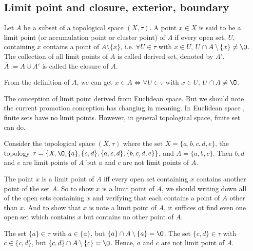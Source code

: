 \subsection{Limit point and closure, exterior, boundary}

\begin{definition}{}{}
    Let $A$ be a subset of a topological space $(X,\tau)$. A point $x\in X$ is said to be a limit point (or accumulation point or cluster point) of 
    $A$ if every open set, $U$, containing $x$ contains a point of $A\setminus\{x\}$, i.e. $\forall U\in\tau$ with $x\in U$, $U\cap A\setminus \{x\}\neq \O$.
    The collection of all limit points of $A$ is called derived set, denoted by $A'$. $\overline{A}:=A\cup A'$ is called the closure of $A$. 
\end{definition}

\begin{remark}
    From the definition of $\overline{A}$, we can get $x\in\overline{A}\Leftrightarrow \forall U\in \tau$ with $x\in U$, $U\cap A\neq \O$.
\end{remark}




The conception of limit point derived from Euclidean space. But we should note the current promotion conception has changing in meaning.
In Euclidean space , finite sets have no limit points. However, in general topological space, finite set can do.

\begin{example}{}{}
    Consider the topological space $(X,\tau)$ where the set $X=\{a,b,c,d,e\}$, the topology $\tau=\{X,\O, \{a\}, \{c,d\},\{a,c,d\},\{b,c,d,e\}\}$, 
    and $A=\{a,b,c\}$. Then $b,d$ and $e$ are limit points of $A$ but $a$ and $c$ are not limit points of $A$. 
\end{example}

The point $x$ is a limit point of $A$ iff every open set containing $x$ contains another point of the set $A$. 
So to show $x$ is a limit point of $A$, 
we should writing down all of the open sets containing $x$ and verifying that each contains a point of $A$ other than $x$.
And to show that $x$ is note a limit point of $A$, 
it suffices ot find even one open set which contains $x$ but contains no other point of $A$. 

\par
The set $\{a\}\in \tau$ with $a\in \{a\}$, but $\{a\}\cap A\setminus\{a\}=\O$. 
The set $\{c,d\}\in \tau$ with $c\in \{c,d\}$, but $\{c,d\}\cap A\setminus\{c\}=\O$.
Hence, $a$ and $c$ are not limit point of $A$.

